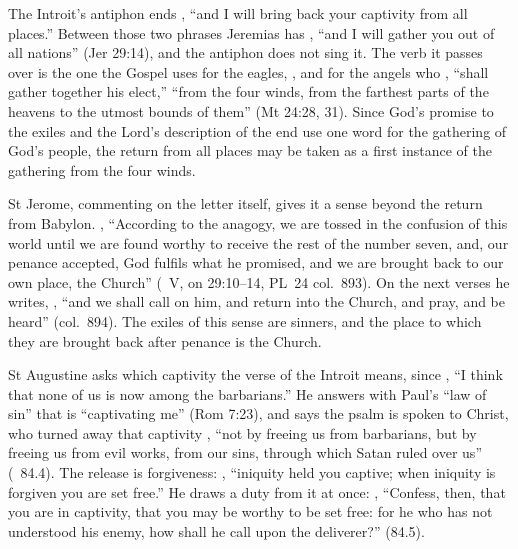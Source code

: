 The Introit's antiphon ends , ``and I will bring back your captivity from all places.'' Between
those two phrases Jeremias has ,
``and I will gather you out of all nations'' (Jer 29:14), and the antiphon
does not sing it. The verb it passes over is the one the Gospel uses for the
eagles, , and for the angels who , ``shall gather together his elect,'' ``from the four winds,
from the farthest parts of the heavens to the utmost bounds of them'' (Mt
24:28, 31). Since God's promise to the exiles and the Lord's description of
the end use one word for the gathering of God's people, the return from all
places may be taken as a first instance of the gathering from the four
winds.

St Jerome, commenting on the letter itself, gives it a sense beyond the return
from Babylon. , ``According to the anagogy, we are tossed in the confusion of this
world until we are found worthy to receive the rest of the number seven, and,
our penance accepted, God fulfils what he promised, and we are brought back to
our own place, the Church'' (~V, on 29:10--14, PL~24
col.~893). On the next verses he writes, , ``and we shall call on
him, and return into the Church, and pray, and be heard'' (col.~894). The
exiles of this sense are sinners, and the place to which they are brought back
after penance is the Church.

St Augustine asks which captivity the verse of the Introit means, since
, ``I think that none
of us is now among the barbarians.'' He answers with Paul's ``law of sin''
that is ``captivating me'' (Rom 7:23), and says the psalm is spoken to Christ,
who turned away that captivity , ``not by freeing us from barbarians, but by freeing us from evil
works, from our sins, through which Satan ruled over us'' (~84.4). The release is forgiveness: , ``iniquity held you captive; when
iniquity is forgiven you are set free.'' He draws a duty from it at once:
, ``Confess, then,
that you are in captivity, that you may be worthy to be set free: for he who
has not understood his enemy, how shall he call upon the deliverer?'' (84.5).

